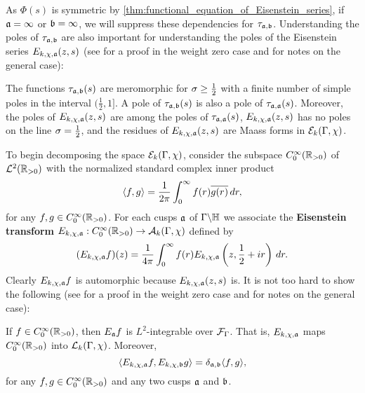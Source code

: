     As $\Phi(s)$ is symmetric by \cref{thm:functional_equation_of_Eisenstein_series}, if $\mathfrak{a} = \infty$ or $\mathfrak{b} = \infty$, we will suppress these dependencies for $\tau_{\mathfrak{a},\mathfrak{b}}$. Understanding the poles of $\tau_{\mathfrak{a},\mathfrak{b}}$ are also important for understanding the poles of the Eisenstein series $E_{k,\chi,\mathfrak{a}}(z,s)$ (see \cite{iwaniec2002spectral} for a proof in the weight zero case and \cite{duke2002subconvexity} for notes on the general case):

    \begin{theorem}\label{thm:residues_of_Eisenstein_series}
      The functions $\tau_{\mathfrak{a},\mathfrak{b}}(s)$ are meromorphic for $\sigma \ge \frac{1}{2}$ with a finite number of simple poles in the interval $(\frac{1}{2},1]$. A pole of $\tau_{\mathfrak{a},\mathfrak{b}}(s)$ is also a pole of $\tau_{\mathfrak{a},\mathfrak{a}}(s)$. Moreover, the poles of $E_{k,\chi,\mathfrak{a}}(z,s)$ are among the poles of $\tau_{\mathfrak{a},\mathfrak{a}}(s)$, $E_{k,\chi,\mathfrak{a}}(z,s)$ has no poles on the line $\sigma = \frac{1}{2}$, and the residues of $E_{k,\chi,\mathfrak{a}}(z,s)$ are Maass forms in $\mathcal{E}_{k}(\Gamma,\chi)$.
    \end{theorem}

    To begin decomposing the space $\mathcal{E}_{k}(\Gamma,\chi)$, consider the subspace $C_{0}^{\infty}(\mathbb{R}_{> 0})$ of $\mathcal{L}^{2}(\mathbb{R}_{> 0})$ with the normalized standard complex inner product
    \[
      \langle f,g\rangle = \frac{1}{2\pi}\int_{0}^{\infty}f(r)\overline{g(r)}\,dr,
    \]
    for any $f,g \in C_{0}^{\infty}(\mathbb{R}_{> 0})$. For each cusps $\mathfrak{a}$ of $\Gamma\backslash\mathbb{H}$ we associate the \textbf{Eisenstein transform} $E_{k,\chi,\mathfrak{a}}:C_{0}^{\infty}(\mathbb{R}_{> 0}) \to \mathcal{A}_{k}(\Gamma,\chi)$ defined by
    \[
      (E_{k,\chi,\mathfrak{a}}f)(z) = \frac{1}{4\pi}\int_{0}^{\infty}f(r)E_{k,\chi,\mathfrak{a}}\left(z,\frac{1}{2}+ir\right)\,dr.
    \]
    Clearly $E_{k,\chi,\mathfrak{a}}f$ is automorphic because $E_{k,\chi,\mathfrak{a}}(z,s)$ is. It is not too hard to show the following (see \cite{iwaniec2002spectral} for a proof in the weight zero case and \cite{duke2002subconvexity} for notes on the general case):

    \begin{proposition}\label{prop:Eisenstein_transform_property}
      If $f \in C_{0}^{\infty}(\mathbb{R}_{> 0})$, then $E_{\mathfrak{a}}f$ is $L^{2}$-integrable over $\mathcal{F}_{\Gamma}$. That is, $E_{k,\chi,\mathfrak{a}}$ maps $C_{0}^{\infty}(\mathbb{R}_{> 0})$ into $\mathcal{L}_{k}(\Gamma,\chi)$. Moreover,
      \[
        \langle E_{k,\chi,\mathfrak{a}}f,E_{k,\chi,\mathfrak{b}}g\rangle = \delta_{\mathfrak{a},\mathfrak{b}}\langle f,g\rangle,
      \]
      for any $f,g \in C_{0}^{\infty}(\mathbb{R}_{> 0})$ and any two cusps $\mathfrak{a}$ and $\mathfrak{b}$.
    \end{proposition}

